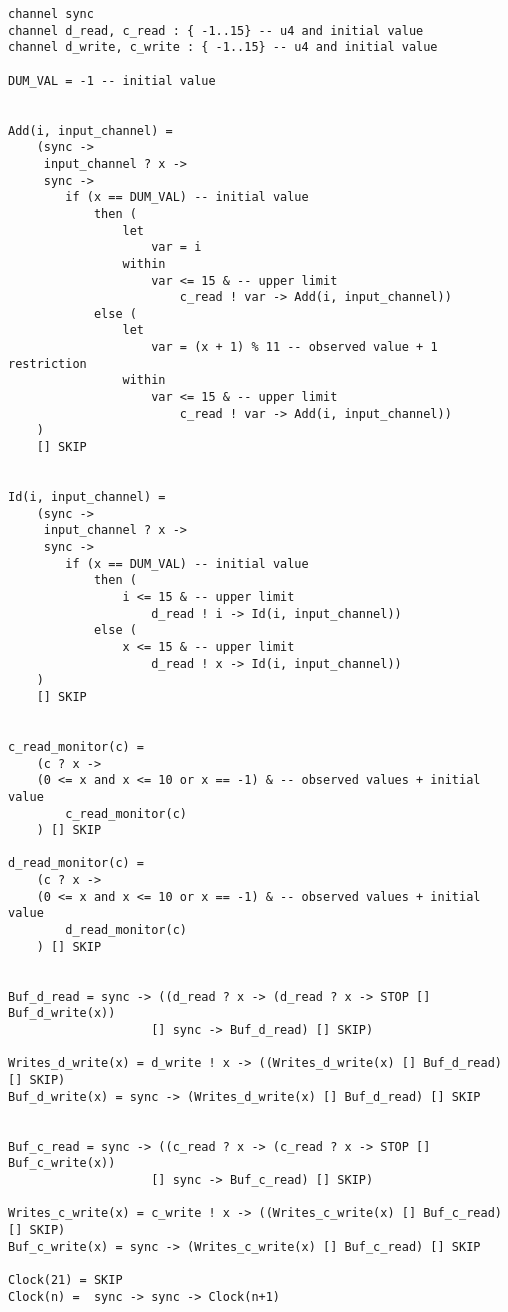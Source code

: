 \begin{verbatim}
channel sync
channel d_read, c_read : { -1..15} -- u4 and initial value
channel d_write, c_write : { -1..15} -- u4 and initial value

DUM_VAL = -1 -- initial value


Add(i, input_channel) =
    (sync ->
     input_channel ? x ->
     sync ->
        if (x == DUM_VAL) -- initial value
            then (
                let
                    var = i
                within
                    var <= 15 & -- upper limit
                        c_read ! var -> Add(i, input_channel))
            else (
                let
                    var = (x + 1) % 11 -- observed value + 1 restriction
                within
                    var <= 15 & -- upper limit
                        c_read ! var -> Add(i, input_channel))
    )
    [] SKIP


Id(i, input_channel) =
    (sync ->
     input_channel ? x ->
     sync ->
        if (x == DUM_VAL) -- initial value
            then (
                i <= 15 & -- upper limit
                    d_read ! i -> Id(i, input_channel))
            else (
                x <= 15 & -- upper limit
                    d_read ! x -> Id(i, input_channel))
    )
    [] SKIP


c_read_monitor(c) =
    (c ? x ->
    (0 <= x and x <= 10 or x == -1) & -- observed values + initial value
        c_read_monitor(c)
    ) [] SKIP

d_read_monitor(c) =
    (c ? x ->
    (0 <= x and x <= 10 or x == -1) & -- observed values + initial value
        d_read_monitor(c)
    ) [] SKIP


Buf_d_read = sync -> ((d_read ? x -> (d_read ? x -> STOP [] Buf_d_write(x))
                    [] sync -> Buf_d_read) [] SKIP)

Writes_d_write(x) = d_write ! x -> ((Writes_d_write(x) [] Buf_d_read) [] SKIP)
Buf_d_write(x) = sync -> (Writes_d_write(x) [] Buf_d_read) [] SKIP


Buf_c_read = sync -> ((c_read ? x -> (c_read ? x -> STOP [] Buf_c_write(x))
                    [] sync -> Buf_c_read) [] SKIP)

Writes_c_write(x) = c_write ! x -> ((Writes_c_write(x) [] Buf_c_read) [] SKIP)
Buf_c_write(x) = sync -> (Writes_c_write(x) [] Buf_c_read) [] SKIP

Clock(21) = SKIP
Clock(n) =  sync -> sync -> Clock(n+1)



\end{verbatim}
